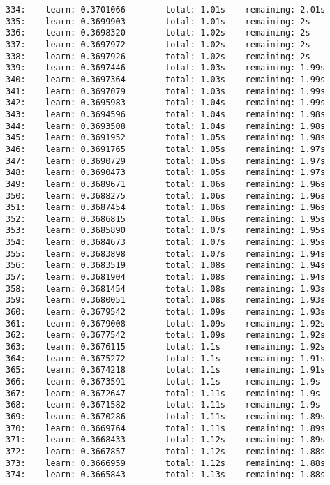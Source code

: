\documentclass[11pt]{article}
\begin{document}
\begin{Verbatim}[commandchars=\\\{\}]
334:    learn: 0.3701066        total: 1.01s    remaining: 2.01s
335:    learn: 0.3699903        total: 1.01s    remaining: 2s
336:    learn: 0.3698320        total: 1.02s    remaining: 2s
337:    learn: 0.3697972        total: 1.02s    remaining: 2s
338:    learn: 0.3697926        total: 1.02s    remaining: 2s
339:    learn: 0.3697446        total: 1.03s    remaining: 1.99s
340:    learn: 0.3697364        total: 1.03s    remaining: 1.99s
341:    learn: 0.3697079        total: 1.03s    remaining: 1.99s
342:    learn: 0.3695983        total: 1.04s    remaining: 1.99s
343:    learn: 0.3694596        total: 1.04s    remaining: 1.98s
344:    learn: 0.3693508        total: 1.04s    remaining: 1.98s
345:    learn: 0.3691952        total: 1.05s    remaining: 1.98s
346:    learn: 0.3691765        total: 1.05s    remaining: 1.97s
347:    learn: 0.3690729        total: 1.05s    remaining: 1.97s
348:    learn: 0.3690473        total: 1.05s    remaining: 1.97s
349:    learn: 0.3689671        total: 1.06s    remaining: 1.96s
350:    learn: 0.3688275        total: 1.06s    remaining: 1.96s
351:    learn: 0.3687454        total: 1.06s    remaining: 1.96s
352:    learn: 0.3686815        total: 1.06s    remaining: 1.95s
353:    learn: 0.3685890        total: 1.07s    remaining: 1.95s
354:    learn: 0.3684673        total: 1.07s    remaining: 1.95s
355:    learn: 0.3683898        total: 1.07s    remaining: 1.94s
356:    learn: 0.3683519        total: 1.08s    remaining: 1.94s
357:    learn: 0.3681904        total: 1.08s    remaining: 1.94s
358:    learn: 0.3681454        total: 1.08s    remaining: 1.93s
359:    learn: 0.3680051        total: 1.08s    remaining: 1.93s
360:    learn: 0.3679542        total: 1.09s    remaining: 1.93s
361:    learn: 0.3679008        total: 1.09s    remaining: 1.92s
362:    learn: 0.3677542        total: 1.09s    remaining: 1.92s
363:    learn: 0.3676115        total: 1.1s     remaining: 1.92s
364:    learn: 0.3675272        total: 1.1s     remaining: 1.91s
365:    learn: 0.3674218        total: 1.1s     remaining: 1.91s
366:    learn: 0.3673591        total: 1.1s     remaining: 1.9s
367:    learn: 0.3672647        total: 1.11s    remaining: 1.9s
368:    learn: 0.3671582        total: 1.11s    remaining: 1.9s
369:    learn: 0.3670286        total: 1.11s    remaining: 1.89s
370:    learn: 0.3669764        total: 1.11s    remaining: 1.89s
371:    learn: 0.3668433        total: 1.12s    remaining: 1.89s
372:    learn: 0.3667857        total: 1.12s    remaining: 1.88s
373:    learn: 0.3666959        total: 1.12s    remaining: 1.88s
374:    learn: 0.3665843        total: 1.13s    remaining: 1.88s

\end{Verbatim}
\end{document}
